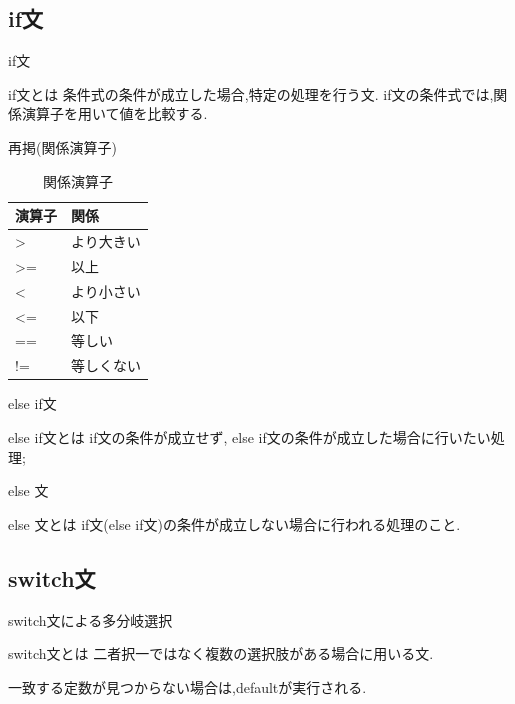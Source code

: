\subsection{if文}
\begin{frame}[fragile]{if文}
    \begin{block}{if文とは}
        条件式の条件が成立した場合,特定の処理を行う文.
        if文の条件式では,関係演算子を用いて値を比較する.
    \end{block}
    
    \begin{exampleblock}{再掲(関係演算子)}
    \small
    \begin{table}[]
        \centering
        \begin{tabular}{|l|l|}
        \hline
        演算子 & 関係\\
        \hline
        > & より大きい\\
        >= & 以上\\
        < & より小さい\\
        <= & 以下\\
        == & 等しい\\
        != & 等しくない\\
        \hline
        \end{tabular}
        \caption{関係演算子}
        \label{tab:my_label}
    \end{table}
    \end{exampleblock}
\end{frame}

\begin{frame}[fragile]{else if文} 
    \begin{block}{else if文とは}
        if文の条件が成立せず, else if文の条件が成立した場合に行いたい処理;
    \end{block}
    
\end{frame}

\begin{frame}[fragile]{else 文}
\begin{block}{else 文とは}
   if文(else if文)の条件が成立しない場合に行われる処理のこと.
\end{block}

\end{frame}
\subsection{switch文}
\begin{frame}[fragile]{switch文による多分岐選択}
    \begin{block}{switch文とは}
        二者択一ではなく複数の選択肢がある場合に用いる文.
    \end{block}
    
    \normalsize	
    一致する定数が見つからない場合は,defaultが実行される.
\end{frame}



